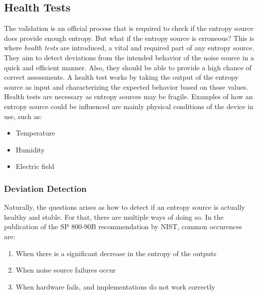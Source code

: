 \subsection{Health Tests}
The validation is an official process that is required to check if the entropy source does provide enough entropy.
But what if the entropy source is erroneous? This is where \emph{health tests} are introduced, a vital and required part of any entropy source.
\newline
They aim to detect deviations from the intended behavior of the noise source in a quick and efficient manner.
Also, they should be able to provide a high chance of correct assessments.
A health test works by taking the output of the entropy source as input and characterizing the expected behavior based on those values.
\emptyline
Health tests are necessary as entropy sources may be fragile. Examples of how an entropy source could be influenced are mainly physical conditions of the device in use, such as:
\begin{itemize}
    \item Temperature
    \item Humidity
    \item Electric field
\end{itemize}

\subsubsection{Deviation Detection}
Naturally, the questions arises as how to detect if an entropy source is actually healthy and stable.
For that, there are multiple ways of doing so. In the publication of the SP 800-90B recommendation by NIST\cite{randomness:sources1}, common occurences are:
\begin{enumerate}
\item When there is a significant decrease in the entropy of the outputs
\item When noise source failures occur
\item When hardware fails, and implementations do not work correctly
\end{enumerate}

